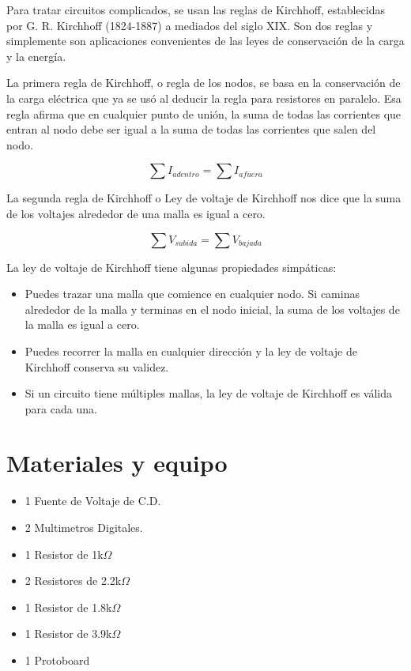 \documentclass[
 reprint,
 amsmath,amssymb,
 aps,
]{revtex4-2}
\begin{document}
Para tratar circuitos complicados, se usan las reglas de Kirchhoff, establecidas por G. R. Kirchhoff (1824-1887) a mediados del siglo XIX. Son dos reglas y simplemente son aplicaciones convenientes de las leyes de conservación de la carga y la energía.

La primera regla de Kirchhoff, o regla de los nodos, se basa en la conservación de la carga eléctrica que ya se usó al deducir la regla para resistores en paralelo. Esa regla afirma que en cualquier punto de unión, la suma de todas las corrientes que entran al nodo debe ser igual a la suma de todas las corrientes que salen del nodo.

\begin{equation}
    \sum I_{adentro}=\sum I_{afuera}\label{eq.2}
\end{equation}


La segunda regla de Kirchhoff o Ley de voltaje de Kirchhoff nos dice que la suma de los voltajes alrededor de una malla es igual a cero.

\cite{Gianco}

\begin{equation}
    \sum V_{subida}=\sum V_{bajada}\label{eq.3}
\end{equation}

La ley de voltaje de Kirchhoff tiene algunas propiedades simpáticas:
\begin{itemize}
    \item Puedes trazar una malla que comience en cualquier nodo. Si caminas alrededor de la malla y terminas en el nodo inicial, la suma de los voltajes de la malla es igual a cero.
    \item Puedes recorrer la malla en cualquier dirección y la ley de voltaje de Kirchhoff conserva su validez.
    \item Si un circuito tiene múltiples mallas, la ley de voltaje de Kirchhoff es válida para cada una.
\end{itemize}

\section{Materiales y equipo}

\begin{itemize}
    \item 1 Fuente de Voltaje de C.D.
    \item 2 Multimetros Digitales.
    \item 1 Resistor de 1k$\Omega$
    \item 2 Resistores de 2.2k$\Omega$
    \item 1 Resistor de 1.8k$\Omega$
    \item 1 Resistor de 3.9k$\Omega$
    \item 1 Protoboard
\end{itemize}
\end{document}
